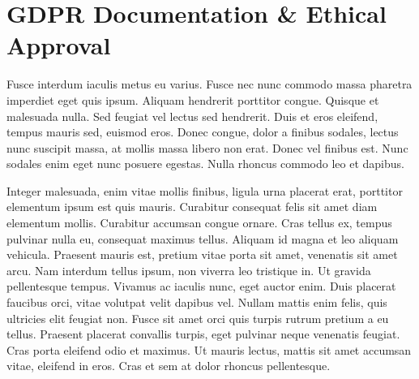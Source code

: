 \section{GDPR Documentation \& Ethical Approval}
\label{app:A}

\MAEindent

Fusce interdum iaculis metus eu varius. Fusce nec nunc commodo massa pharetra imperdiet eget quis ipsum. Aliquam hendrerit porttitor congue. Quisque et malesuada nulla. Sed feugiat vel lectus sed hendrerit. Duis et eros eleifend, tempus mauris sed, euismod eros. Donec congue, dolor a finibus sodales, lectus nunc suscipit massa, at mollis massa libero non erat. Donec vel finibus est. Nunc sodales enim eget nunc posuere egestas. Nulla rhoncus commodo leo et dapibus.

Integer malesuada, enim vitae mollis finibus, ligula urna placerat erat, porttitor elementum ipsum est quis mauris. Curabitur consequat felis sit amet diam elementum mollis. Curabitur accumsan congue ornare. Cras tellus ex, tempus pulvinar nulla eu, consequat maximus tellus. Aliquam id magna et leo aliquam vehicula. Praesent mauris est, pretium vitae porta sit amet, venenatis sit amet arcu. Nam interdum tellus ipsum, non viverra leo tristique in. Ut gravida pellentesque tempus. Vivamus ac iaculis nunc, eget auctor enim. Duis placerat faucibus orci, vitae volutpat velit dapibus vel. Nullam mattis enim felis, quis ultricies elit feugiat non. Fusce sit amet orci quis turpis rutrum pretium a eu tellus. Praesent placerat convallis turpis, eget pulvinar neque venenatis feugiat. Cras porta eleifend odio et maximus. Ut mauris lectus, mattis sit amet accumsan vitae, eleifend in eros. Cras et sem at dolor rhoncus pellentesque.




